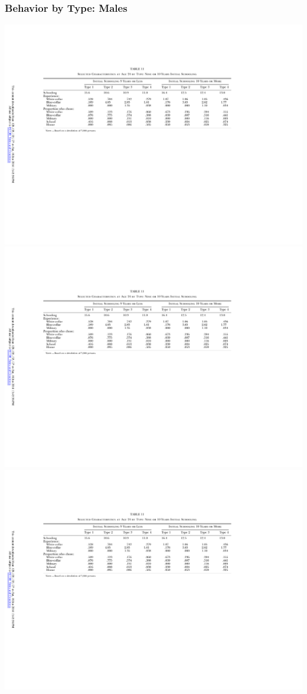 \begin{frame}
	\frametitle{Behavior by Type: Males}
	\includegraphics[width=\textwidth]{tab-figs/table11_1997_header}	\\
	\includegraphics{tab-figs/table11_1997_left}  \includegraphics{tab-figs/table11a_1997}	\\	

\end{frame}
